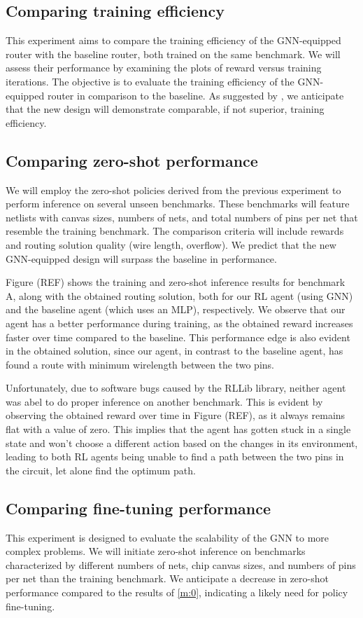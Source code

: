 \documentclass[letterpaper]{article}
\begin{document}
\subsection{Comparing training efficiency}
This experiment aims to compare the training efficiency of the GNN-equipped
router with the baseline router, both trained on the same benchmark. We will
assess their performance by examining the plots of reward versus training
iterations. The objective is to evaluate the training efficiency of the
GNN-equipped router in comparison to the baseline. As suggested by
\cite{Wang2018}, we anticipate that the new design will demonstrate comparable,
if not superior, training efficiency.

\subsection{Comparing zero-shot performance} \label{m:0} We will employ the
zero-shot policies derived from the previous experiment to perform inference on
several unseen benchmarks. These benchmarks will feature netlists with canvas
sizes, numbers of nets, and total numbers of pins per net that resemble the
training benchmark. The comparison criteria will include rewards and routing
solution quality (wire length, overflow). We predict that the new GNN-equipped
design will surpass the baseline in performance.

Figure (REF) shows the training and zero-shot inference results for benchmark A,
along with the obtained routing solution, both for our RL agent (using GNN) and
the baseline agent (which uses an MLP), respectively. We observe that our agent
has a better performance during training, as the obtained reward increases
faster over time compared to the baseline. This performance edge is also evident
in the obtained solution, since our agent, in contrast to the baseline agent,
has found a route with minimum wirelength between the two pins.

Unfortunately, due to software bugs caused by the RLLib library, neither agent
was abel to do proper inference on another benchmark. This is evident by
observing the obtained reward over time in Figure (REF), as it always remains
flat with a value of zero. This implies that the agent has gotten stuck in a
single state and won't choose a different action based on the changes in its
environment, leading to both RL agents being unable to find a path between the
two pins in the circuit, let alone find the optimum path.

\subsection{Comparing fine-tuning performance}
This experiment is designed to evaluate the scalability of the GNN to more
complex problems. We will initiate zero-shot inference on benchmarks
characterized by different numbers of nets, chip canvas sizes, and numbers of
pins per net than the training benchmark. We anticipate a decrease in zero-shot
performance compared to the results of \autoref{m:0}, indicating a likely need
for policy fine-tuning.
\end{document}
